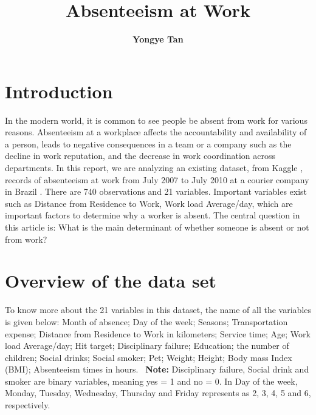 \documentclass{article}
\author[1]{\textbf{Yongye Tan}}
\title{\textbf{\huge Absenteeism at Work}}
\date{}
\begin{document}
\pagestyle{headings}	
\newpage
\setcounter{page}{1}
\renewcommand{\thepage}{\arabic{page}}


	
	
\setlength{\parskip}{0.5em}
	
\maketitle


\section{Introduction}
In the modern world, it is common to see people be absent from work for various reasons. Absenteeism at a workplace affects the accountability and availability of a person, leads to negative consequences in a team or a company such as the decline in work reputation, and the decrease in work coordination across departments. In this report, we are analyzing an existing dataset, from Kaggle \cite{wagner_2019}, records of absenteeism at work from July 2007 to July 2010 at a courier company in Brazil \cite{vulpen_2021}. There are 740 observations and 21 variables. Important variables exist such as Distance from Residence to Work, Work load Average/day, which are important factors to determine why a worker is absent.
The central question in this article is: What is the main determinant of whether someone is absent or not from work?


\section{Overview of the data set}
To know more about the 21 variables in this dataset, the name of all the variables is given below: Month of absence; Day of the week; Seasons; Transportation expense; Distance from Residence to Work in kilometers; Service time; Age; Work load Average/day; Hit target; Disciplinary failure; Education; the number of children; Social drinks; Social smoker; Pet; Weight; Height; Body mass Index (BMI); Absenteeism times in hours. \
\textbf{Note:} Disciplinary failure, Social drink and smoker are binary variables, meaning yes = 1 and no = 0. In Day of the week, Monday, Tuesday, Wednesday, Thursday and Friday represents as 2, 3, 4, 5 and 6, respectively.
\end{document}
